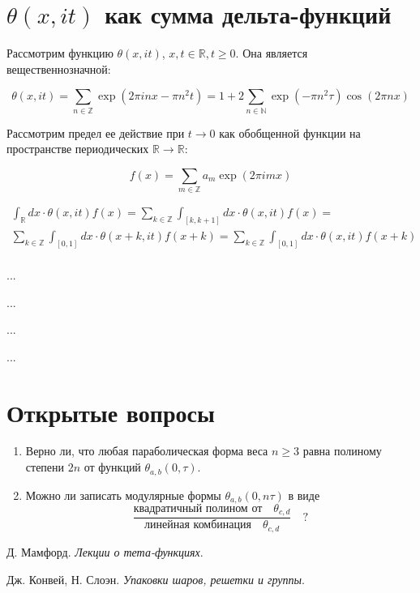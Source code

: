 \documentclass{article}
\newcommand{\ZZ}{\mathbb{Z}}
\newcommand{\NN}{\mathbb{N}}
\newcommand{\RR}{\mathbb{R}}
\theoremstyle{break}
\begin{document}
\section{$\theta(x, it)$ как сумма дельта-функций}

Рассмотрим функцию $\theta(x, it)$, $x, t \in \RR,  t \ge 0$. Она является вещественнозначной:

$$
\theta(x, it)=
\sum_{n \in \ZZ} \exp(2 \pi i n x - \pi n^2 t)
=1 + 2\sum_{n \in \NN} \exp(-\pi n^2 \tau) \cos(2 \pi n x)
$$

Рассмотрим предел ее действие при $t \to 0$ как обобщенной функции на пространстве периодических $\RR \to \RR$:

$$f(x)=\sum_{m \in \ZZ} a_m \exp{(2 \pi i m x)}$$

\begin{equation*}
	\begin{split}
		\int_{\RR} dx \cdot \theta(x, it) f(x) = 
		\sum_{k \in \ZZ} \int_{[k, k+1]} dx \cdot \theta (x, it) f(x) = \\
		\sum_{k \in \ZZ} \int_{[0, 1]} dx \cdot \theta (x + k, it) f(x + k) =  
		\sum_{k \in \ZZ} \int_{[0, 1]} dx \cdot \theta (x, it) f(x + k) \\
	\end{split}
\end{equation*}

...

...

...

...


\section{Открытые вопросы}

\begin{enumerate}
	\item Верно ли, что любая параболическая форма веса $n \ge 3$ равна полиному
	степени $2n$ от функций $\theta_{a, b}(0, \tau)$.
	\item Можно ли записать модулярные формы $\theta_{a, b}(0, n\tau)$ в виде
	$$
	\frac{\text{квадратичный полином от} \quad \theta_{c, d}}{\text{линейная комбинация} \quad \theta_{c, d}}
	\quad ?
	$$
\end{enumerate}

\begin{thebibliography}{999}
	
	Д. Мамфорд.
	\emph{Лекции о тета-функциях}.
	
	Дж. Конвей, Н. Слоэн. 
	\emph{Упаковки шаров, решетки и группы}.
	
	
\end{thebibliography}
\end{document}
